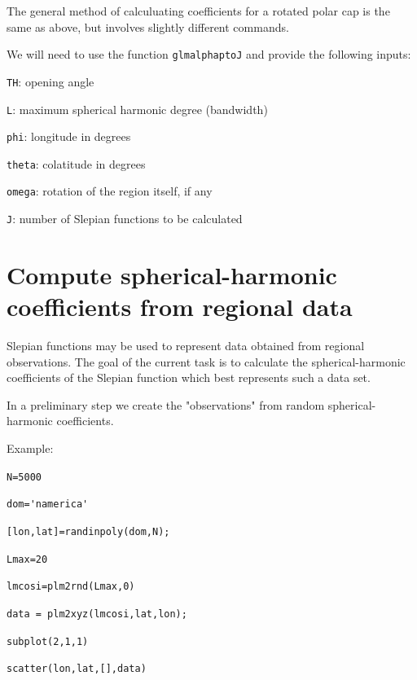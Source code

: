 \documentclass{article}
\begin{document}
\setlength{\parskip}{0.5cm plus4mm minus3mm}

The general method of calculuating coefficients for a rotated polar cap is the same as above, but involves slightly different commands.

We will need to use the function \verb!glmalphaptoJ! and provide the following inputs:

\verb!TH!: opening angle

\verb!L!: maximum spherical harmonic degree (bandwidth)

\verb!phi!: longitude in degrees

\verb!theta!: colatitude in degrees

\verb!omega!: rotation of the region itself, if any

\verb!J!: number of Slepian functions to be calculated

\section{Compute spherical-harmonic coefficients from regional data}

Slepian functions may be used to represent data obtained from regional observations. The goal of the current task is to calculate the spherical-harmonic coefficients of the Slepian function which best represents such a data set.

In a preliminary step we create the "observations" from random spherical-harmonic coefficients. 

Example:

\vspace{3mm}

\setlength{\parskip}{.1mm}

\verb!N=5000!

\verb!dom='namerica'!

\verb![lon,lat]=randinpoly(dom,N);!

\verb!Lmax=20!

\verb!lmcosi=plm2rnd(Lmax,0)!

\verb!data = plm2xyz(lmcosi,lat,lon);!

\verb!subplot(2,1,1)!

\verb!scatter(lon,lat,[],data)!
\end{document}
